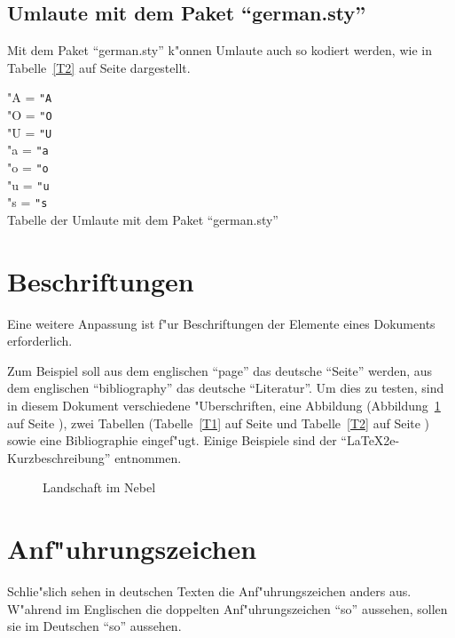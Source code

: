 \documentclass[11pt]{report} %
\begin{document}
\subsection{Umlaute mit dem Paket "`german.sty"'}
Mit dem Paket "`german.sty"' k"onnen Umlaute auch so kodiert werden, wie
in Tabelle~\ref{T2} auf Seite \pageref{T2} dargestellt.
\begin{table}[ht]
"A = \verb|"A|\\
"O = \verb|"O|\\
"U = \verb|"U|\\
"a = \verb|"a|\\
"o = \verb|"o|\\
"u = \verb|"u|\\
"s = \verb|"s|\\
\caption{Tabelle der Umlaute mit dem Paket "`german.sty"'} 
\label{T2}
\end{table}

\section{Beschriftungen}

Eine weitere Anpassung ist f"ur Beschriftungen der Elemente eines
Dokuments erforderlich. 

Zum Beispiel soll aus dem englischen "`page"' das deutsche "`Seite"'
werden, aus dem englischen "`bibliography"' das deutsche "`Literatur"'.
Um dies zu testen, sind in diesem Dokument verschiedene "Uberschriften,
eine Abbildung (Abbildung~\ref{A1} auf Seite \pageref{A1}), zwei
Tabellen (Tabelle~\ref{T1} auf Seite \pageref{T1} und Tabelle~\ref{T2}
auf Seite \pageref{T2}) sowie eine Bibliographie eingef"ugt. Einige
Beispiele sind der "`LaTeX2e-Kurzbeschreibung"' \cite{l2kurz} entnommen.


\begin{figure}[tb]
\vspace{4cm}
\caption{Landschaft im Nebel} 
\label{A1}
\end{figure}

\section{Anf"uhrungszeichen}

Schlie"slich sehen in deutschen Texten die Anf"uhrungszeichen anders
aus. W"ahrend im Englischen die doppelten Anf"uhrungszeichen ``so''
aussehen, sollen sie im Deutschen "`so"' aussehen. 
\end{document}
